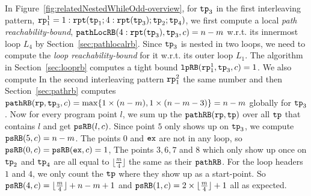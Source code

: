 In Figure~\ref{fig:relatedNestedWhileOdd-overview}, for $\mathtt{tp}_3$ in the first interleaving pattern, $\mathtt{rp}_1^1 = 1: \mathtt{rpt}(\mathtt{tp}_1; 4:\mathtt{rpt}(\mathtt{tp}_3); \mathtt{tp}_2; \mathtt{tp}_4)$, 
we first compute a local \emph{path reachability-bound}, $\mathtt{pathLocRB}(4:\mathtt{rpt}(\mathtt{tp}_3), \mathtt{tp}_3, c) = n - m$
w.r.t. its innermost loop $L_4$ by Section~\ref{sec:pathlocalrb}.
Since $\mathtt{tp}_3$ is nested in two loops, we need to compute the \emph{loop reachability-bound} for it
w.r.t. its outer loop $L_1$. The algorithm in Section~\ref{sec:looprb} computes a tight bound $\mathtt{lpRB}(\mathtt{rp}_1^1, \mathtt{tp}_3, c) = 1$. We also compute In the second interleaving pattern $\mathtt{rp}_1^2$ the same number and
then
Section~\ref{sec:pathrb} computes $\mathtt{pathRB}(\mathtt{rp}, \mathtt{tp}_3, c) = \max\{ 1 \times (n - m), 1 \times (n - m - 3) \} = n - m$ globally for $\mathtt{tp}_3$.
%
Now for every program point $l$, we sum up the $\mathtt{pathRB}(\mathtt{rp}, \mathtt{tp})$ over all $\mathtt{tp}$ that contains $l$ and get $\mathtt{psRB}(l, c)$.
Since point $5$ only shows up on $\mathtt{tp}_3$, we compute {$\mathtt{psRB}(5, c) = n - m$}.
The points $0$ and $\mathtt{ex}$ are not in any loop, so $\mathtt{psRB}(0, c) = \mathtt{psRB}(\mathtt{ex}, c) = 1$,
The points $3, 6, 7$ and $8$ which only show up once on $\mathtt{tp}_2$ and $\mathtt{tp}_4$ are all equal to $\lfloor\frac{m}{4}\rfloor$ the same as their $\mathtt{pathRB}$.
For the loop headers $1$ and $4$, we only count the $\mathtt{tp}$ where they show up as a start-point.
So $\mathtt{psRB}(4, c) = \lfloor\frac{m}{4}\rfloor + n - m + 1$ and $\mathtt{psRB}(1,c) = 2 \times \lfloor\frac{m}{4}\rfloor + 1$ all as expected.